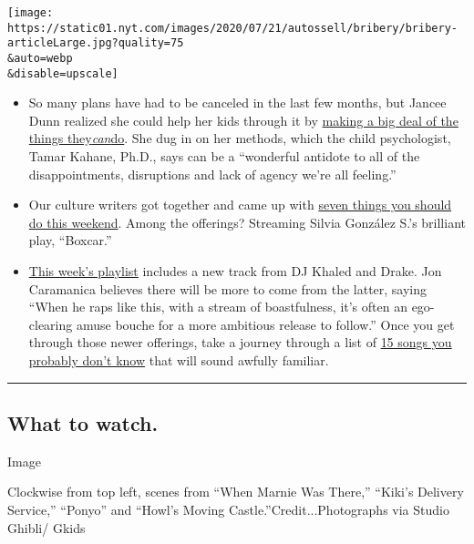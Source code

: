 \texttt{[image: https://static01.nyt.com/images/2020/07/21/autossell/bribery/bribery-articleLarge.jpg?quality=75\\\&auto=webp\\\&disable=upscale]}

\begin{itemize}
\item
  So many plans have had to be canceled in the last few months, but
  Jancee Dunn realized she could help her kids through it by
  \href{https://www.nytimes.com/2020/07/17/parenting/kid-activities-summer.html}{making
  a big deal of the things
  they}\href{https://www.nytimes.com/2020/07/17/parenting/kid-activities-summer.html}{\emph{can}}\href{https://www.nytimes.com/2020/07/17/parenting/kid-activities-summer.html}{do}.
  She dug in on her methods, which the child psychologist, Tamar Kahane,
  Ph.D., says can be a ``wonderful antidote to all of the
  disappointments, disruptions and lack of agency we're all feeling.''
\item
  Our culture writers got together and came up with
  \href{https://www.nytimes.com/2020/07/16/arts/things-to-do-weekend-coronavirus.html}{seven
  things you should do this weekend}. Among the offerings? Streaming
  Silvia González S.'s brilliant play, ``Boxcar.''
\item
  \href{https://www.nytimes.com/2020/07/17/arts/music/playlist-drake-dj-khaled-mariah-carey.html}{This
  week's playlist} includes a new track from DJ Khaled and Drake. Jon
  Caramanica believes there will be more to come from the latter, saying
  ``When he raps like this, with a stream of boastfulness, it's often an
  ego-clearing amuse bouche for a more ambitious release to follow.''
  Once you get through those newer offerings, take a journey through a
  list of
  \href{https://www.nytimes.com/2020/07/15/arts/music/pop-hip-hop-samples.html}{15
  songs you probably don't know} that will sound awfully familiar.
\end{itemize}

\begin{center}\rule{0.5\linewidth}{\linethickness}\end{center}

\hypertarget{what-to-watch}{%
\subsection{What to watch.}\label{what-to-watch}}

Image

Clockwise from top left, scenes from ``When Marnie Was There,'' ``Kiki's
Delivery Service,'' ``Ponyo'' and ``Howl's Moving
Castle.''Credit...Photographs via Studio Ghibli/ Gkids

